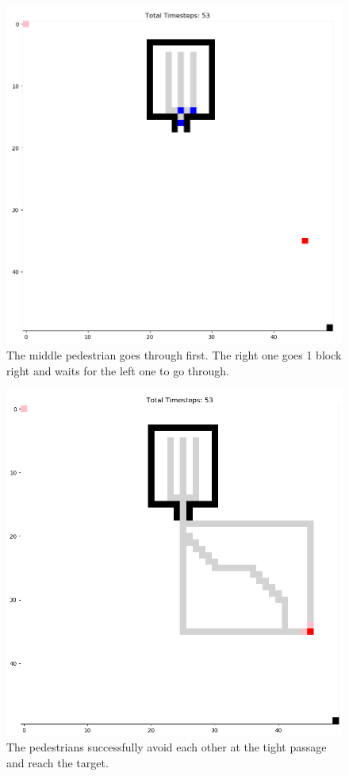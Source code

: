\documentclass[10pt,a4paper]{article}
\begin{document}
\begin{figure}[h!]
    \centering
    \includegraphics[width=\textwidth]{pictures/mid_task4_cong.PNG}
    \caption{The middle pedestrian goes through first. The right one goes 1 block right and waits for the left one to go through.}
    \label{fig:cong_mid}
\end{figure}
\begin{figure}[h!]
    \centering
    \includegraphics[width=\textwidth]{pictures/end_task4_cong.PNG}
    \caption{The pedestrians successfully avoid each other at the tight passage and reach the target.}
    \label{fig:cong_end}
\end{figure}
\end{document}
